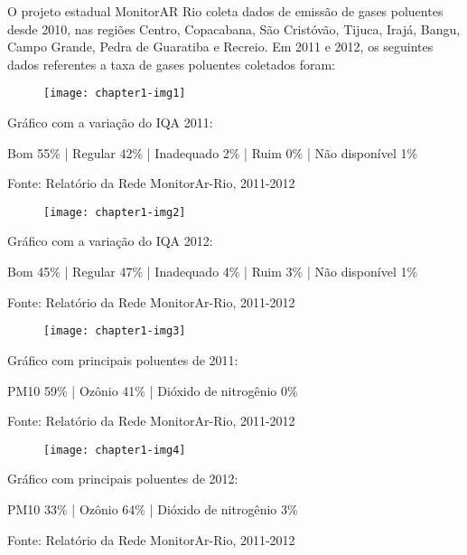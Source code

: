 O projeto estadual MonitorAR Rio coleta dados de emissão de gases poluentes desde 2010, nas regiões 
Centro, Copacabana, São Cristóvão, Tijuca, Irajá, Bangu, Campo Grande, Pedra de Guaratiba e Recreio. 
Em 2011 e 2012, os seguintes dados referentes a taxa de gases poluentes coletados foram:

\begin{figure*}
	\centering
	\begin{subfigure}{0.5\textwidth}
		\centering
		\texttt{[image: chapter1-img1]}
	\end{subfigure}
    \par
     \small { 
        Gráfico com a variação do IQA 2011: 
        \par
        Bom 55\% | Regular 42\% | Inadequado 2\% | Ruim 0\% | Não disponível 1\% 
        \par
        Fonte: Relatório da Rede MonitorAr-Rio, 2011-2012 }
\end{figure*}

\begin{figure*}
	\centering
	\begin{subfigure}{0.5\textwidth}
		\centering
		\texttt{[image: chapter1-img2]}
	\end{subfigure}
    \par
     \small { 
        Gráfico com a variação do IQA 2012: 
        \par
        Bom 45\% | Regular 47\% | Inadequado 4\% | Ruim 3\% | Não disponível 1\%
        \par
        Fonte: Relatório da Rede MonitorAr-Rio, 2011-2012 }
\end{figure*}

\begin{figure*}
	\centering
	\begin{subfigure}{0.5\textwidth}
		\centering
		\texttt{[image: chapter1-img3]}
	\end{subfigure}
    \par
     \small { 
        Gráfico com principais poluentes de 2011: 
        \par
        PM10 59\% | Ozônio 41\% | Dióxido de nitrogênio 0\%
        \par
        Fonte: Relatório da Rede MonitorAr-Rio, 2011-2012 }
\end{figure*}

\begin{figure*}
	\centering
	\begin{subfigure}{0.5\textwidth}
		\centering
		\texttt{[image: chapter1-img4]}
	\end{subfigure}
    \par
     \small { 
        Gráfico com principais poluentes de 2012:
        \par
        PM10 33\% | Ozônio 64\% | Dióxido de nitrogênio 3\% 
        \par
        Fonte: Relatório da Rede MonitorAr-Rio, 2011-2012 }
\end{figure*}

